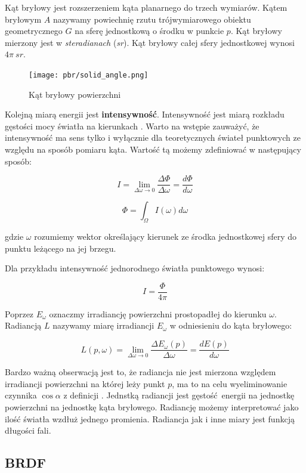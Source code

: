 \documentclass[../main.tex]{subfiles}
\begin{document}
Kąt bryłowy jest rozszerzeniem kąta planarnego do trzech wymiarów. Kątem
bryłowym $A$ nazywamy powiechnię rzutu trójwymiarowego obiektu geometrycznego
$G$ na sferę jednostkową o środku w punkcie $p$. Kąt bryłowy mierzony jest w
\textit{steradianach} (\textit{sr}). Kąt bryłowy całej sfery jednostkowej
wynosi
  $4\pi \:{sr}$.

\begin{figure}[ht]
  \centering
  \texttt{[image: pbr/solid\_angle.png]}
  \caption{Kąt bryłowy powierzchni}
  \label{fig:SolidAngle}
\end{figure}

Kolejną miarą energii jest \textbf{intensywność}. Intensywność jest miarą
rozkładu gęstości mocy światła na kierunkach \cite[p. 328]{pbrt}. Warto na
wstępie zauważyć, że intensywność ma sens tylko i wyłącznie dla teoretycznych
świateł punktowych ze względu na sposób pomiaru kąta. Wartość tą możemy
zdefiniować w następujący sposób:

$$
I = \lim_{\Delta\omega \rightarrow 0} {
    \frac{\Delta\Phi}{\Delta\omega}
} = \frac{d\Phi}{d\omega}
$$

$$
\Phi = \int_{\Omega} {I(\omega) d\omega}
$$

gdzie $\omega$ rozumiemy wektor określający kierunek ze środka jednostkowej
sfery do punktu leżącego na jej brzegu.

Dla przykładu intensywność jednorodnego światła punktowego wynosi:

$$
I = \frac{\Phi}{4\pi}
$$

Poprzez $E_{\omega}$ oznaczmy irradiancję powierzchni prostopadłej do kierunku
$\omega$. Radiancją $L$ nazywamy miarę irradiancji $E_{\omega}$ w odniesieniu
do kąta bryłowego:

$$
L(p, \omega) = \lim_{\Delta\omega \rightarrow 0} {
  \frac{\Delta E_{\omega} (p)}{\Delta\omega}
} =
\frac{d E(p)}{d \omega}
$$

Bardzo ważną obserwacją jest to, że radiancja nie jest mierzona względem
irradiancji powierzchni na której leży punkt $p$, ma to na celu wyeliminowanie
czynnika $\cos \alpha$ z definicji \cite[p. 339]{pbrt}. Jednstką radiancji
jest gęstość energii na jednostkę powierzchni na jednostkę kąta bryłowego.
Radiancję możemy interpretować jako ilość światła wzdłuż jednego promienia.
Radiancja jak i inne miary jest funkcją długości fali.

\subsection{BRDF}
\end{document}
